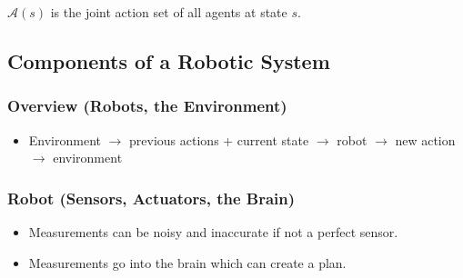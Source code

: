 \begin{warning}
    $\mathcal{A}(s)$ is the joint action set of all agents at state $s$.
\end{warning}
\newpage

\subsection{Components of a Robotic System}
\begin{summary}
\end{summary}
\newpage

\subsubsection{Overview (Robots, the Environment)}
\begin{definition}
\end{definition}

\begin{notes}
    \begin{itemize}
        \item Environment \(\rightarrow\) previous actions + current state \(\rightarrow\) robot \(\rightarrow\) new action \(\rightarrow\) environment
    \end{itemize}
\end{notes}

\subsubsection{Robot (Sensors, Actuators, the Brain)}
\begin{definition}
\end{definition}

\begin{notes}
    \begin{itemize}
        \item Measurements can be noisy and inaccurate if not a perfect sensor. 
        \item Measurements go into the brain which can create a plan.
    \end{itemize}
\end{notes}
\newpage

